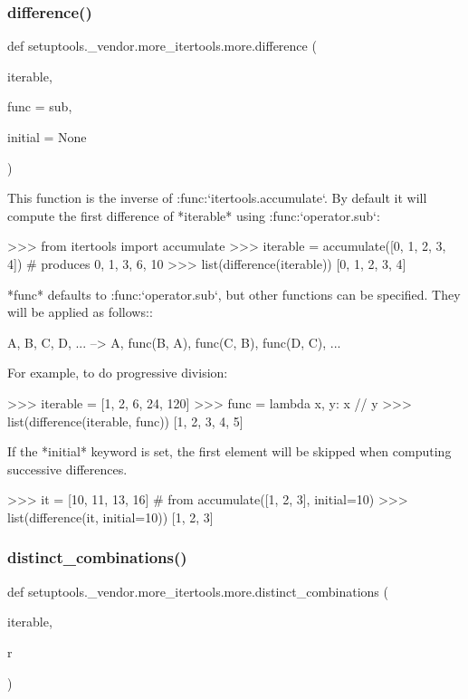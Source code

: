 \subsubsection{\texorpdfstring{difference()}{difference()}}
{\footnotesize\ttfamily def setuptools.\+\_\+vendor.\+more\+\_\+itertools.\+more.\+difference (\begin{DoxyParamCaption}\item[{}]{iterable,  }\item[{}]{func = {\ttfamily sub},  }\item[{}]{initial = {\ttfamily None} }\end{DoxyParamCaption})}

\begin{DoxyVerb}This function is the inverse of :func:`itertools.accumulate`. By default
it will compute the first difference of *iterable* using
:func:`operator.sub`:

    >>> from itertools import accumulate
    >>> iterable = accumulate([0, 1, 2, 3, 4])  # produces 0, 1, 3, 6, 10
    >>> list(difference(iterable))
    [0, 1, 2, 3, 4]

*func* defaults to :func:`operator.sub`, but other functions can be
specified. They will be applied as follows::

    A, B, C, D, ... --> A, func(B, A), func(C, B), func(D, C), ...

For example, to do progressive division:

    >>> iterable = [1, 2, 6, 24, 120]
    >>> func = lambda x, y: x // y
    >>> list(difference(iterable, func))
    [1, 2, 3, 4, 5]

If the *initial* keyword is set, the first element will be skipped when
computing successive differences.

    >>> it = [10, 11, 13, 16]  # from accumulate([1, 2, 3], initial=10)
    >>> list(difference(it, initial=10))
    [1, 2, 3]\end{DoxyVerb}
 \mbox{\label{namespacesetuptools_1_1__vendor_1_1more__itertools_1_1more_a3825558c5c1fde62db5c724bcbb3de04}} 
\subsubsection{\texorpdfstring{distinct\+\_\+combinations()}{distinct\_combinations()}}
{\footnotesize\ttfamily def setuptools.\+\_\+vendor.\+more\+\_\+itertools.\+more.\+distinct\+\_\+combinations (\begin{DoxyParamCaption}\item[{}]{iterable,  }\item[{}]{r }\end{DoxyParamCaption})}

